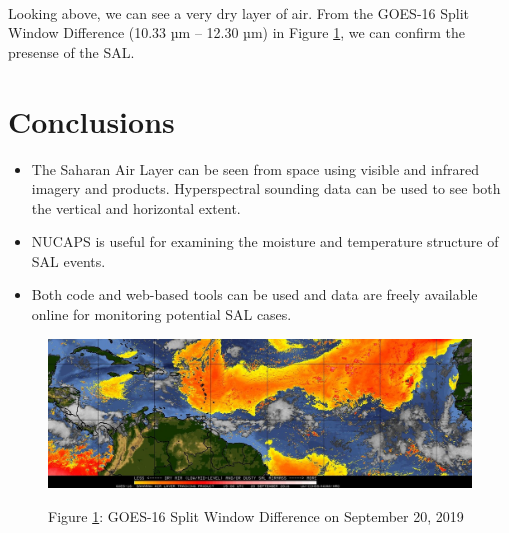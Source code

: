 \documentclass[11pt]{article}
\makeatletter
\def\maxwidth{\ifdim\Gin@nat@width>\linewidth\linewidth
    \else\Gin@nat@width\fi}
\let\Oldincludegraphics\includegraphics
\renewcommand{\includegraphics}[1]{\Oldincludegraphics[width=.8\maxwidth]{#1}}
\providecommand{\tightlist}{%
      \setlength{\itemsep}{0pt}\setlength{\parskip}{0pt}}
\makeatother
\begin{document}
    \begin{center}
    \end{center}
    { \hspace*{\fill} \\}

    Looking above, we can see a very dry layer of air. From the GOES-16
Split Window Difference (10.33 µm -- 12.30 µm) in Figure \ref{fig:split}, we can confirm the
presense of the SAL.

\section{Conclusions}\label{conclusions}

\begin{itemize}
  \tightlist
  \item
    The Saharan Air Layer can be seen from space using visible and infrared imagery and products. Hyperspectral sounding data can be used to see both the vertical and horizontal extent.
  \item
    NUCAPS is useful for examining the moisture and temperature structure of SAL events.
  \item
    Both code and web-based tools can be used and data are freely
    available online for monitoring potential SAL cases.
  \end{itemize}

\begin{figure}[h]
\centering
\includegraphics{images/20180920.15.NWAtlantic.SALgoes16split.png}
\label{fig:split}
\caption{Figure \ref{fig:split}: GOES-16
Split Window Difference on September 20, 2019}
\end{figure}
\end{document}
